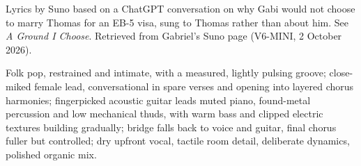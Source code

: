 
\begin{notes}
Lyrics by Suno based on a ChatGPT conversation on why Gabi would not choose to marry Thomas for an EB-5 visa, sung to Thomas rather than about him. See \emph{A Ground I Choose}. Retrieved from Gabriel’s Suno page (V6-MINI, 2 October 2026).
\end{notes}
\begin{style}
Folk pop, restrained and intimate, with a measured, lightly pulsing groove; close-miked female lead, conversational in spare verses and opening into layered chorus harmonies; fingerpicked acoustic guitar leads muted piano, found-metal percussion and low mechanical thuds, with warm bass and clipped electric textures building gradually; bridge falls back to voice and guitar, final chorus fuller but controlled; dry upfront vocal, tactile room detail, deliberate dynamics, polished organic mix.
\end{style}

